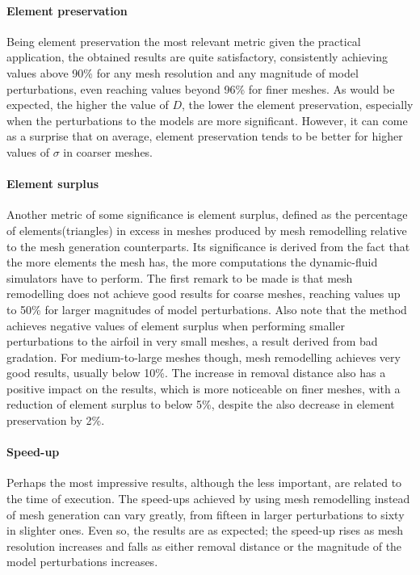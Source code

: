 \paragraph{Element preservation} Being element preservation the most relevant metric given the practical application, the obtained results are quite satisfactory, consistently achieving values above 90\% for any mesh resolution and any magnitude of model perturbations, even reaching values beyond 96\% for finer meshes. As would be expected, the higher the value of $D$, the lower the element preservation, especially when the perturbations to the models are more significant. However, it can come as a surprise that on average, element preservation tends to be better for higher values of $\sigma$ in coarser meshes.



\paragraph{Element surplus} Another metric of some significance is element surplus, defined as the percentage of elements(triangles) in excess in meshes produced by mesh remodelling relative to the mesh generation counterparts. Its significance is derived from the fact that the more elements the mesh has, the more computations the dynamic-fluid simulators have to perform. The first remark to be made is that mesh remodelling does not achieve good results for coarse meshes, reaching values up to 50\% for larger magnitudes of model perturbations. Also note that the method achieves negative values of element surplus when performing smaller perturbations to the airfoil in very small meshes, a result derived from bad gradation. For medium-to-large meshes though, mesh remodelling achieves very good results, usually below 10\%. The increase in removal distance also has a positive impact on the results, which is more noticeable on finer meshes, with a reduction of element surplus to below 5\%, despite the also decrease in element preservation by 2\%.



\paragraph{Speed-up} Perhaps the most impressive results, although the less important, are related to the time of execution. The speed-ups achieved by using mesh remodelling instead of mesh generation can vary greatly, from fifteen in larger perturbations to sixty in slighter ones. Even so, the results are as expected; the speed-up rises as mesh resolution increases and falls as either removal distance or the magnitude of the model perturbations increases.

